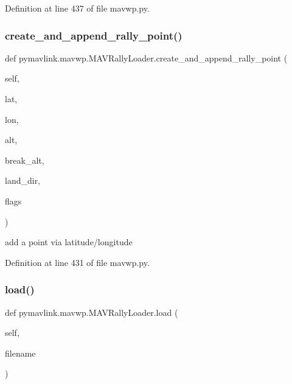 Definition at line 437 of file mavwp.\+py.

\mbox{\label{classpymavlink_1_1mavwp_1_1MAVRallyLoader_a34fca935daac50b5e47783e823091c37}} 
\subsubsection{\texorpdfstring{create\_and\_append\_rally\_point()}{create\_and\_append\_rally\_point()}}
{\footnotesize\ttfamily def pymavlink.\+mavwp.\+M\+A\+V\+Rally\+Loader.\+create\+\_\+and\+\_\+append\+\_\+rally\+\_\+point (\begin{DoxyParamCaption}\item[{}]{self,  }\item[{}]{lat,  }\item[{}]{lon,  }\item[{}]{alt,  }\item[{}]{break\+\_\+alt,  }\item[{}]{land\+\_\+dir,  }\item[{}]{flags }\end{DoxyParamCaption})}

\begin{DoxyVerb}add a point via latitude/longitude\end{DoxyVerb}
 

Definition at line 431 of file mavwp.\+py.

\mbox{\label{classpymavlink_1_1mavwp_1_1MAVRallyLoader_aa6e38565a5644b7e5d1cc7dddd3b04cd}} 
\subsubsection{\texorpdfstring{load()}{load()}}
{\footnotesize\ttfamily def pymavlink.\+mavwp.\+M\+A\+V\+Rally\+Loader.\+load (\begin{DoxyParamCaption}\item[{}]{self,  }\item[{}]{filename }\end{DoxyParamCaption})}

